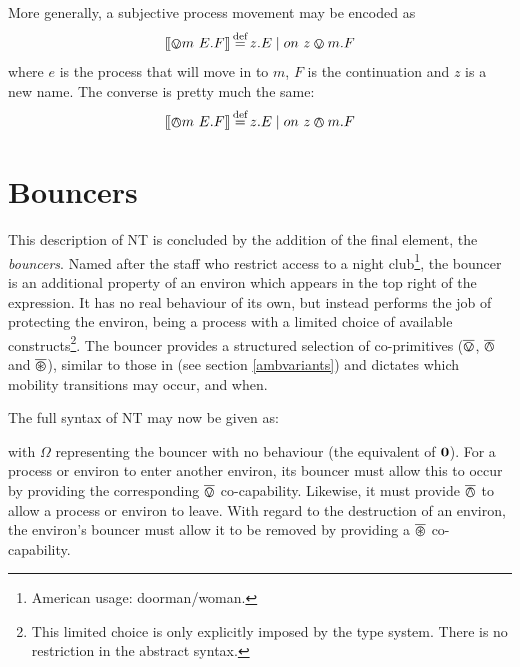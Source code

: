 More generally, a subjective process movement may be encoded as
\begin{equation}
[\hspace{-0.3ex}[ \varovee m\ {E}.F ]\hspace{-0.3ex}] \operatorname{\stackrel{\textrm{def}}{=}} z.E \;|\; on\ z \varovee m.F
\end{equation}
where $e$ is the process that will move in to $m$, $F$ is
the continuation and $z$ is a new name.  The converse is pretty much the same:
\begin{equation}
[\hspace{-0.3ex}[ \varowedge m\ {E}.F ]\hspace{-0.3ex}] \operatorname{\stackrel{\textrm{def}}{=}} z.E \;|\; on\ z \varowedge m.F
\end{equation}

\section{Bouncers}
\label{bouncers}

This description of NT is concluded by the addition of the final
element, the \emph{bouncers}.  Named after the staff who restrict
access to a night club\footnote{American usage: doorman/woman.}, the
bouncer is an additional property of an environ which appears in the
top right of the expression.  It has no real behaviour of its own, but
instead performs the job of protecting the environ, being a process
with a limited choice of available constructs\footnote{This limited
  choice is only explicitly imposed by the type system.  There is no
  restriction in the abstract syntax.}.  The bouncer provides a
structured selection of co-primitives ($\overline{\varovee}$, $\overline{\varowedge}$ and $\overline{\varoast}$),
similar to those in \cite{sangiorgi:mobsafeambients} (see section
\ref{ambvariants}) and dictates which mobility transitions may occur,
and when.

The full syntax of NT may now be given as:

\begin{equation}
  
   \label{eqn:nt:syntax}
\end{equation}
with $\Omega$ representing the bouncer with no behaviour (the
equivalent of $\textbf{0}$).  For a process or environ to enter another
environ, its bouncer must allow this to occur by providing the
corresponding $\overline{\varovee}$ co-capability.  Likewise, it must provide $\overline{\varowedge}$
to allow a process or environ to leave.  With regard to the destruction
of an environ, the environ's bouncer must allow it to be removed by
providing a $\overline{\varoast}$ co-capability.

